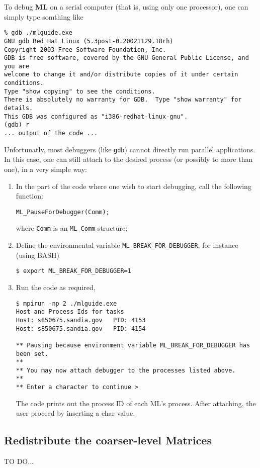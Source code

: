 \documentclass[10pt,letter,relax]{SANDreport}
\newcommand{\ML}     {{\bf ML }}
\begin{document}
To debug \ML on a serial computer (that is, using only one processor),
one can simply type somthing like
\begin{verbatim}
% gdb ./mlguide.exe
GNU gdb Red Hat Linux (5.3post-0.20021129.18rh)
Copyright 2003 Free Software Foundation, Inc.
GDB is free software, covered by the GNU General Public License, and you are
welcome to change it and/or distribute copies of it under certain conditions.
Type "show copying" to see the conditions.
There is absolutely no warranty for GDB.  Type "show warranty" for details.
This GDB was configured as "i386-redhat-linux-gnu".
(gdb) r
... output of the code ...
\end{verbatim}
Unfortunatly, most debuggers (like \verb!gdb!) cannot directly run
parallel applications. In this case, one can still attach to the desired
process (or possibly to more than one), in a very simple way:
\begin{enumerate}
\item In the part of the code where one wish to start debugging, call
  the following function:
\begin{verbatim}
ML_PauseForDebugger(Comm);
\end{verbatim}
where \verb!Comm! is an \verb!ML_Comm! structure;
\item Define the environmental variable \verb!ML_BREAK_FOR_DEBUGGER!,
  for instance (using BASH)
\begin{verbatim}
$ export ML_BREAK_FOR_DEBUGGER=1
\end{verbatim}
\item Run the code as required,
\begin{verbatim}
$ mpirun -np 2 ./mlguide.exe
Host and Process Ids for tasks
Host: s850675.sandia.gov   PID: 4153
Host: s850675.sandia.gov   PID: 4154

** Pausing because environment variable ML_BREAK_FOR_DEBUGGER has been set.
**
** You may now attach debugger to the processes listed above.
**
** Enter a character to continue >
\end{verbatim}
The code prints out the process ID of each ML's process. After
attaching, the user proceed by inserting a char value.
\end{enumerate}

\subsection{Redistribute the coarser-level Matrices}

TO DO...
\end{document}
